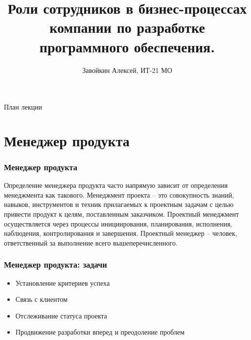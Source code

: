 \documentclass{../industrial-development}
\title{Роли сотрудников в бизнес-процессах компании по разработке программного обеспечения.}
\author{Завойкин Алексей, ИТ-21 МО}
\date{}
\begin{document}
\begin{frame}
  \titlepage
\end{frame}

\begin{frame}{План лекции}
  \tableofcontents
\end{frame}

\section{Менеджер продукта }

\begin{frame} \frametitle{Менеджер продукта }
  
\end{frame}

\lecturenotes

Определение менеджера продукта часто напрямую зависит от определения менеджмента как такового. Менеджмент проекта – это совокупность знаний, навыков, инструментов и техник прилагаемых к проектным задачам с целью привести продукт к целям, поставленным заказчиком. Проектный менеджмент осуществляется через процессы инициирования, планирования, исполнения, наблюдения, контролирования и завершения. Проектный менеджер – человек, ответственный за выполнение всего вышеперечисленного. 
  ~\cite{Anatomy}
  
\begin{frame} \frametitle{Менеджер продукта: задачи}
  \begin{itemize}
  \item Установление критериев успеха
  \item Связь с клиентом
  \item Отслеживание статуса проекта
  \item Продвижение разработки вперед и преодоление проблем 
  \end{itemize}
\end{frame}

\lecturenotes
\end{document}

